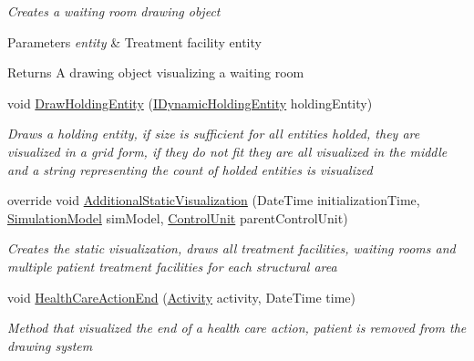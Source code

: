 \begin{DoxyCompactItemize}
\begin{DoxyCompactList}\small\item\em Creates a waiting room drawing object 
\begin{DoxyParams}{Parameters}
{\em entity} & Treatment facility entity\\
\hline
\end{DoxyParams}
\begin{DoxyReturn}{Returns}
A drawing object visualizing a waiting room
\end{DoxyReturn}
\end{DoxyCompactList}\item 
void \hyperlink{class_sample_hospital_model_1_1_visualization_1_1_w_p_f_visualization_engine_health_care_department_control_unit_a0d4ef8176bd2251ff53971e7ddfad3f3}{Draw\+Holding\+Entity} (\hyperlink{interface_simulation_core_1_1_h_c_c_m_elements_1_1_i_dynamic_holding_entity}{I\+Dynamic\+Holding\+Entity} holding\+Entity)
\begin{DoxyCompactList}\small\item\em Draws a holding entity, if size is sufficient for all entities holded, they are visualized in a grid form, if they do not fit they are all visualized in the middle and a string representing the count of holded entities is visualized \end{DoxyCompactList}\item 
override void \hyperlink{class_sample_hospital_model_1_1_visualization_1_1_w_p_f_visualization_engine_health_care_department_control_unit_aa57efb82b63494b349a5977073019c43}{Additional\+Static\+Visualization} (Date\+Time initialization\+Time, \hyperlink{class_simulation_core_1_1_simulation_classes_1_1_simulation_model}{Simulation\+Model} sim\+Model, \hyperlink{class_simulation_core_1_1_h_c_c_m_elements_1_1_control_unit}{Control\+Unit} parent\+Control\+Unit)
\begin{DoxyCompactList}\small\item\em Creates the static visualization, draws all treatment facilities, waiting rooms and multiple patient treatment facilities for each structural area \end{DoxyCompactList}\item 
void \hyperlink{class_sample_hospital_model_1_1_visualization_1_1_w_p_f_visualization_engine_health_care_department_control_unit_a780a15d08281938df5c17a0b24584d2d}{Health\+Care\+Action\+End} (\hyperlink{class_simulation_core_1_1_h_c_c_m_elements_1_1_activity}{Activity} activity, Date\+Time time)
\begin{DoxyCompactList}\small\item\em Method that visualized the end of a health care action, patient is removed from the drawing system \end{DoxyCompactList}\item 

\end{DoxyCompactItemize}
